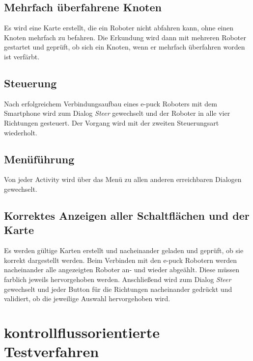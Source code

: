 \documentclass[10pt,a4paper]{article}
\begin{document}
		\subsection{Mehrfach \"uberfahrene Knoten}
			Es wird eine Karte erstellt, die ein Roboter nicht abfahren kann, ohne einen Knoten mehrfach zu befahren. Die Erkundung wird dann mit mehreren Roboter 
 			gestartet und gepr\"uft, ob sich ein Knoten, wenn er mehrfach \"uberfahren worden ist verf\"arbt.
		\subsection{Steuerung}
			Nach erfolgreichem Verbindungsaufbau eines e-puck Roboters mit dem Smartphone wird zum Dialog \textit{Steer} gewechselt und der Roboter in alle vier
			Richtungen gesteuert. Der Vorgang wird mit der zweiten Steuerungsart wiederholt.
		\subsection{Men\"uf\"uhrung}
			Von jeder Activity wird \"uber das Men\"u zu allen anderen erreichbaren Dialogen gewechselt.
		\subsection{Korrektes Anzeigen aller Schaltfl\"achen und der Karte}
			Es werden g\"ultige Karten erstellt und nacheinander geladen und gepr\"uft, ob sie korrekt dargestellt werden. Beim Verbinden mit den e-puck Robotern werden 
			nacheinander alle angezeigten Roboter an- und wieder abge\"ahlt. Diese m\"ussen farblich jeweils hervorgehoben werden. Anschlie\ss end wird zum Dialog 
			\textit{Steer} gewechselt und jeder Button f\"ur die Richtungen nacheinander gedr\"uckt und validiert, ob die jeweilige Auswahl hervorgehoben wird.
	\section{kontrollflussorientierte Testverfahren}

				 			
\end{document}
